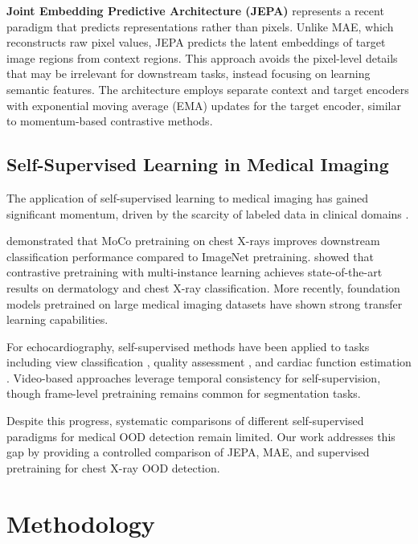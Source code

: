 \documentclass[11pt,a4paper]{article}
\begin{document}
\textbf{Joint Embedding Predictive Architecture (JEPA)} \citep{assran2023self} represents a recent paradigm that predicts representations rather than pixels. Unlike MAE, which reconstructs raw pixel values, JEPA predicts the latent embeddings of target image regions from context regions. This approach avoids the pixel-level details that may be irrelevant for downstream tasks, instead focusing on learning semantic features. The architecture employs separate context and target encoders with exponential moving average (EMA) updates for the target encoder, similar to momentum-based contrastive methods.

\subsection{Self-Supervised Learning in Medical Imaging}

The application of self-supervised learning to medical imaging has gained significant momentum, driven by the scarcity of labeled data in clinical domains \citep{chen2019self, azizi2021big}.

\citet{sowrirajan2021moco} demonstrated that MoCo pretraining on chest X-rays improves downstream classification performance compared to ImageNet pretraining. \citet{azizi2021big} showed that contrastive pretraining with multi-instance learning achieves state-of-the-art results on dermatology and chest X-ray classification. More recently, foundation models pretrained on large medical imaging datasets \citep{huang2023foundation} have shown strong transfer learning capabilities.

For echocardiography, self-supervised methods have been applied to tasks including view classification \citep{dezaki2017cardiac}, quality assessment \citep{abdi2017automatic}, and cardiac function estimation \citep{ouyang2020video}. Video-based approaches leverage temporal consistency for self-supervision, though frame-level pretraining remains common for segmentation tasks.

Despite this progress, systematic comparisons of different self-supervised paradigms for medical OOD detection remain limited. Our work addresses this gap by providing a controlled comparison of JEPA, MAE, and supervised pretraining for chest X-ray OOD detection.

\section{Methodology}
\end{document}
